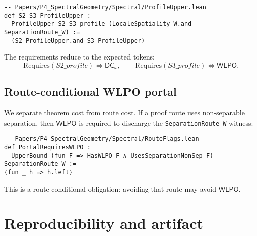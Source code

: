 \documentclass[11pt]{article}
\newcommand{\WLPO}{\mathsf{WLPO}}
\newcommand{\DCw}{\mathsf{DC}_{\omega}}
\newcommand{\lean}[1]{\texttt{#1}}
\theoremstyle{plain}
\theoremstyle{definition}
\theoremstyle{remark}
\begin{document}
\begin{lstlisting}
-- Papers/P4_SpectralGeometry/Spectral/ProfileUpper.lean
def S2_S3_ProfileUpper :
  ProfileUpper S2_S3_profile (LocaleSpatiality_W.and SeparationRoute_W) :=
  (S2_ProfileUpper.and S3_ProfileUpper)
\end{lstlisting}

The requirements reduce to the expected tokens:
\[
  \mathrm{Requires}(S2\_profile) \iff \DCw,\qquad
  \mathrm{Requires}(S3\_profile) \iff \WLPO.
\]

\subsection{Route-conditional WLPO portal}
We separate theorem cost from route cost. If a proof route uses non-separable
separation, then \(\WLPO\) is required to discharge the \lean{SeparationRoute\_W}
witness:

\begin{lstlisting}
-- Papers/P4_SpectralGeometry/Spectral/RouteFlags.lean
def PortalRequiresWLPO :
  UpperBound (fun F => HasWLPO F ∧ UsesSeparationNonSep F) SeparationRoute_W :=
⟨fun _ h => h.left⟩
\end{lstlisting}

This is a route-conditional obligation: avoiding that route may avoid \(\WLPO\).

\section{Reproducibility and artifact}
\end{document}
